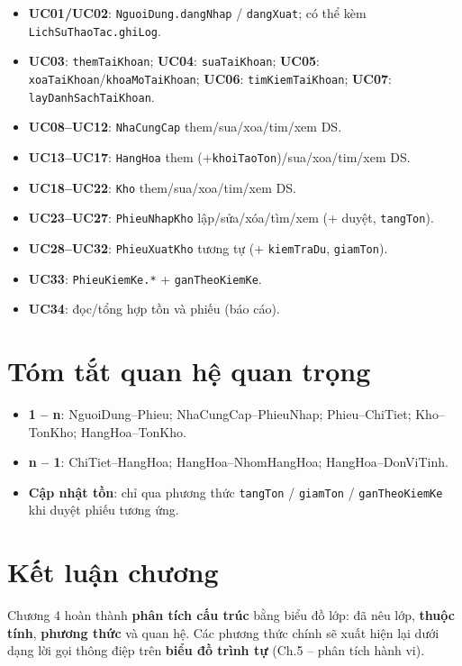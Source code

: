 \begin{itemize}[leftmargin=1.5cm]
    \item \textbf{UC01/UC02}: \texttt{NguoiDung.dangNhap} / \texttt{dangXuat}; có thể kèm \texttt{LichSuThaoTac.ghiLog}.
    \item \textbf{UC03}: \texttt{themTaiKhoan}; \textbf{UC04}: \texttt{suaTaiKhoan}; \textbf{UC05}: \texttt{xoaTaiKhoan}/\texttt{khoaMoTaiKhoan}; \textbf{UC06}: \texttt{timKiemTaiKhoan}; \textbf{UC07}: \texttt{layDanhSachTaiKhoan}.
    \item \textbf{UC08--UC12}: \texttt{NhaCungCap} them/sua/xoa/tim/xem DS.
    \item \textbf{UC13--UC17}: \texttt{HangHoa} them (+\texttt{khoiTaoTon})/sua/xoa/tim/xem DS.
    \item \textbf{UC18--UC22}: \texttt{Kho} them/sua/xoa/tim/xem DS.
    \item \textbf{UC23--UC27}: \texttt{PhieuNhapKho} lập/sửa/xóa/tìm/xem (+ duyệt, \texttt{tangTon}).
    \item \textbf{UC28--UC32}: \texttt{PhieuXuatKho} tương tự (+ \texttt{kiemTraDu}, \texttt{giamTon}).
    \item \textbf{UC33}: \texttt{PhieuKiemKe.*} + \texttt{ganTheoKiemKe}.
    \item \textbf{UC34}: đọc/tổng hợp tồn và phiếu (báo cáo).
\end{itemize}

\section{Tóm tắt quan hệ quan trọng}

\begin{itemize}[leftmargin=1.5cm]
    \item \textbf{1 -- n}: NguoiDung--Phieu; NhaCungCap--PhieuNhap; Phieu--ChiTiet; Kho--TonKho; HangHoa--TonKho.
    \item \textbf{n -- 1}: ChiTiet--HangHoa; HangHoa--NhomHangHoa; HangHoa--DonViTinh.
    \item \textbf{Cập nhật tồn}: chỉ qua phương thức \texttt{tangTon} / \texttt{giamTon} / \texttt{ganTheoKiemKe} khi duyệt phiếu tương ứng.
\end{itemize}

\section{Kết luận chương}

Chương 4 hoàn thành \textbf{phân tích cấu trúc} bằng biểu đồ lớp: đã nêu lớp, \textbf{thuộc tính}, \textbf{phương thức} và quan hệ. Các phương thức chính sẽ xuất hiện lại dưới dạng lời gọi thông điệp trên \textbf{biểu đồ trình tự} (Ch.5 -- phân tích hành vi).
